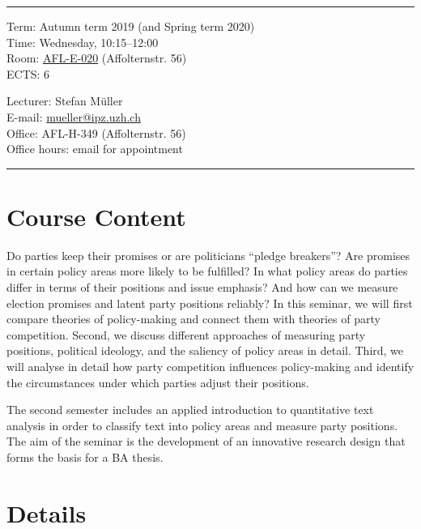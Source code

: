 \documentclass[abstract=on,parskip=full,headings=standardclasses,fontsize=11pt,paper=a4]{scrartcl}
\begin{document}
\hrule
\medskip
\begin{minipage}[t]{0.5\textwidth}
Term: Autumn term 2019 (and Spring term 2020) \\
Time: Wednesday, 10:15--12:00 \\
Room:  \href{https://www.plaene.uzh.ch/AFL}{AFL-E-020} (Affolternstr. 56) \\
ECTS: 6
\end{minipage}
\begin{minipage}[t]{0.49\textwidth}
\begin{flushright}
Lecturer: Stefan Müller \\
E-mail: \href{mailto:mueller@ipz.uzh.ch}{\textsf{mueller@ipz.uzh.ch}} \\
Office:  AFL-H-349 (Affolternstr. 56) \\
Office hours: email for appointment \\
\end{flushright}
\end{minipage}
\medskip
\vspace{2.5mm}
\hrule 

\section*{Course Content}

Do parties keep their promises or are politicians ``pledge breakers''? Are promises in certain policy areas more likely to be fulfilled? In what policy areas do parties differ in terms of their positions and issue emphasis? And how can we measure election promises and latent party positions reliably? In this seminar, we will first compare theories of policy-making and connect them with theories of party competition. Second, we discuss different approaches of measuring party positions, political ideology, and the saliency of policy areas in detail. Third, we will analyse in detail how party competition influences policy-making and identify the circumstances under which parties adjust their positions.

The second semester includes an applied introduction to quantitative text analysis in order to classify text into policy areas and measure party positions. The aim of the seminar is the development of an innovative research design that forms the basis for a BA thesis.


\section*{Details}
\end{document}
